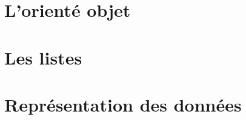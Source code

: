 \documentclass[a4paper,doubleside]{book}
\begin{document}

	
	
	

	
	\chapter{L'orienté objet}
	\chapter{Les listes}
	\chapter{Représentation des données}

%
%
%
%

\end{document}
